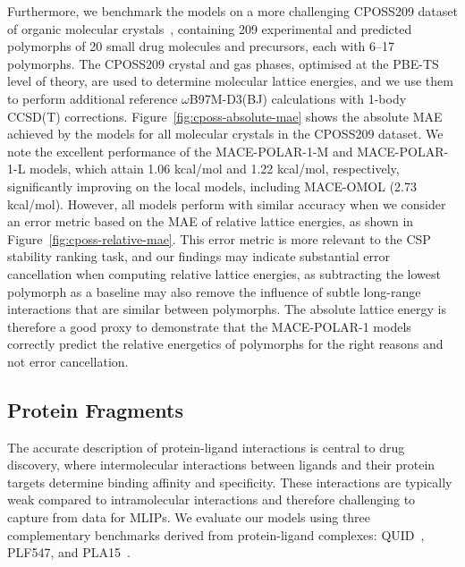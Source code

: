 \documentclass[aps,%
superscriptaddress,
 amsmath,amssymb,
floatfix,
twocolumn
]{revtex4-2}
\newcommand{\MFP}{MACE-POLAR-1 }
\newcommand{\MFPM}{MACE-POLAR-1-M }
\newcommand{\MFPL}{MACE-POLAR-1-L }
\begin{document}
Furthermore, we benchmark the models on a more challenging CPOSS209 dataset of organic molecular crystals~\cite{cposs209}, containing 209 experimental and predicted polymorphs of 20 small drug molecules and precursors, each with 6--17 polymorphs. The CPOSS209 crystal and gas phases, optimised at the PBE-TS level of theory, are used to determine molecular lattice energies, and we use them to perform additional reference $\omega$B97M-D3(BJ) calculations with 1-body CCSD(T) corrections. Figure~\ref{fig:cposs-absolute-mae} shows the absolute MAE achieved by the models for all molecular crystals in the CPOSS209 dataset. We note the excellent performance of the \MFPM and \MFPL models, which attain 1.06 kcal/mol and 1.22 kcal/mol, respectively, significantly improving on the local models, including MACE-OMOL (2.73 kcal/mol). However, all models perform with similar accuracy when we consider an error metric based on the MAE of relative lattice energies, as shown in Figure~\ref{fig:cposs-relative-mae}. This error metric is more relevant to the CSP stability ranking task, and our findings may indicate substantial error cancellation when computing relative lattice energies, as subtracting the lowest polymorph as a baseline may also remove the influence of subtle long-range interactions that are similar between polymorphs. The absolute lattice energy is therefore a good proxy to demonstrate that the \MFP models correctly predict the relative energetics of polymorphs for the right reasons and not error cancellation.

\subsection{Protein Fragments}

The accurate description of protein-ligand interactions is central to drug discovery, where intermolecular interactions between ligands and their protein targets determine binding affinity and specificity. These interactions are typically weak compared to intramolecular interactions and therefore challenging to capture from data for MLIPs. We evaluate our models using three complementary benchmarks derived from protein-ligand complexes: QUID~\cite{puleva2025quid}, PLF547, and PLA15~\cite{kriz2020benchmarking}. 
\end{document}
